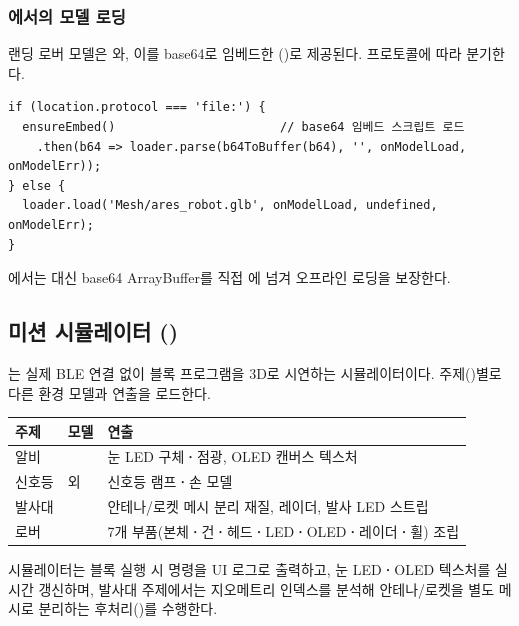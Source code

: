 \subsubsection{에서의 모델 로딩}

랜딩 로버 모델은 와, 이를 base64로
임베드한 
()로 제공된다.
프로토콜에 따라 분기한다.

\begin{verbatim}
if (location.protocol === 'file:') {
  ensureEmbed()                       // base64 임베드 스크립트 로드
    .then(b64 => loader.parse(b64ToBuffer(b64), '', onModelLoad, onModelErr));
} else {
  loader.load('Mesh/ares_robot.glb', onModelLoad, undefined, onModelErr);
}
\end{verbatim}

에서는  대신 base64 ArrayBuffer를 직접
에 넘겨 오프라인 로딩을 보장한다.

\subsection{미션 시뮬레이터 ()}

는 실제 BLE 연결 없이 블록 프로그램을 3D로 시연하는
시뮬레이터이다. 주제()별로 다른 환경 모델과 연출을 로드한다.

\begin{longtable}{L{2.8cm} L{4.2cm} L{6.8cm}}
\toprule
{}\textbf{주제} & \textbf{모델} & \textbf{연출} \\
\midrule
\endhead
알비 &  & 눈 LED 구체\textbf{·}점광, OLED 캔버스 텍스처 \\
신호등 &  외 & 신호등 램프\textbf{·}손 모델 \\
발사대 &  & 안테나/로켓 메시 분리 재질, 레이더, 발사 LED 스트립 \\
로버 &  & 7개 부품(본체\textbf{·}건\textbf{·}헤드\textbf{·}LED\textbf{·}OLED\textbf{·}레이더\textbf{·}휠) 조립 \\
\bottomrule
\end{longtable}

시뮬레이터는 블록 실행 시 명령을 UI 로그로 출력하고, 눈 LED\textbf{·}OLED 텍스처를
실시간 갱신하며, 발사대 주제에서는 지오메트리 인덱스를 분석해 안테나/로켓을
별도 메시로 분리하는 후처리()를 수행한다.


